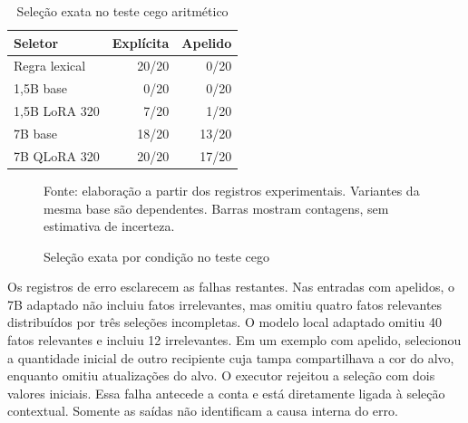 \documentclass[12pt,a4paper]{article}
\begin{document}
\begin{table}[htbp]\centering\caption{Seleção exata no teste cego aritmético}\label{tab:blind}\begin{tabular}{lrr}\toprule Seletor & Explícita & Apelido\\\midrule Regra lexical & 20/20 & 0/20\\
1,5B base & 0/20 & 0/20\\
1,5B LoRA 320 & 7/20 & 1/20\\
7B base & 18/20 & 13/20\\
7B QLoRA 320 & 20/20 & 17/20\\ \bottomrule\end{tabular}\par{}\end{table}
\begin{figure}[htbp]\centering
\caption{Seleção exata por condição no teste cego}\label{fig:blind}
\par{\fontsize{10}{12}\selectfont Fonte: elaboração a partir dos registros experimentais. Variantes da mesma base são dependentes. Barras mostram contagens, sem estimativa de incerteza.\par}\end{figure}

Os registros de erro esclarecem as falhas restantes. Nas entradas com apelidos, o 7B adaptado não incluiu fatos irrelevantes, mas omitiu quatro fatos relevantes distribuídos por três seleções incompletas. O modelo local adaptado omitiu 40 fatos relevantes e incluiu 12 irrelevantes. Em um exemplo com apelido, selecionou a quantidade inicial de outro recipiente cuja tampa compartilhava a cor do alvo, enquanto omitiu atualizações do alvo. O executor rejeitou a seleção com dois valores iniciais. Essa falha antecede a conta e está diretamente ligada à seleção contextual. Somente as saídas não identificam a causa interna do erro.
\end{document}

